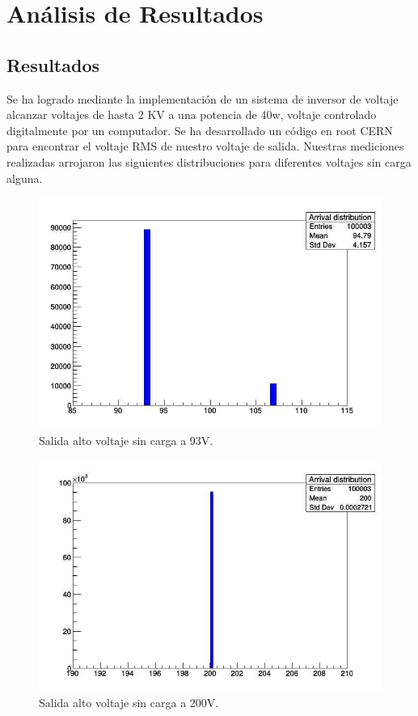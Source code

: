 \chapter{Análisis de Resultados}
\section{Resultados}

Se ha logrado mediante la implementación de un sistema de inversor de voltaje alcanzar voltajes de hasta 2 KV a una potencia de 40w, voltaje controlado digitalmente por un computador. Se ha desarrollado un código en root CERN para encontrar el voltaje RMS de nuestro voltaje de salida. Nuestras mediciones realizadas arrojaron las siguientes distribuciones para diferentes voltajes sin carga alguna. \\

\begin{figure}[H]
\centering
\includegraphics[width=12cm]{Capitulo4/93v.jpg}
\caption{Salida alto voltaje sin carga a 93V.}
\end{figure}

\begin{figure}[H]
\centering
\includegraphics[width=12cm]{Capitulo4/200v.jpg}
\caption{Salida alto voltaje sin carga a 200V.}
\end{figure}

